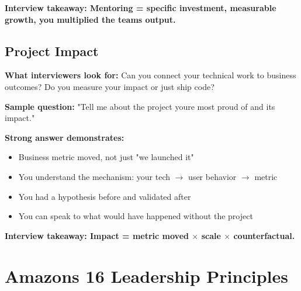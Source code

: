 \documentclass[11pt]{article}
\providecommand{\tightlist}{\setlength{\itemsep}{1pt}\setlength{\parskip}{0pt}}
\begin{document}
\textbf{Interview takeaway: Mentoring = specific investment, measurable growth, you multiplied the team\textquotesingle s output.}

\subsection{Project Impact}\label{project-impact}

\textbf{What interviewers look for:} Can you connect your technical work to business outcomes? Do you measure your impact or just ship code?

\textbf{Sample question:} "Tell me about the project you\textquotesingle re most proud of and its impact."

\textbf{Strong answer demonstrates:}

\begin{itemize}
\tightlist
\item
  Business metric moved, not just "we launched it"
\item
  You understand the mechanism: your tech \(\rightarrow\) user behavior \(\rightarrow\) metric
\item
  You had a hypothesis before and validated after
\item
  You can speak to what would have happened without the project
\end{itemize}

\textbf{Interview takeaway: Impact = metric moved \(\times\) scale \(\times\) counterfactual.}

\section{Amazon\textquotesingle s 16 Leadership Principles}\label{amazons-16-leadership-principles}
\end{document}
